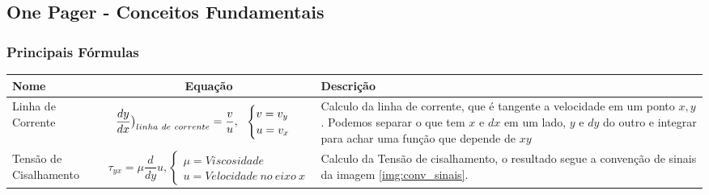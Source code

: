 \documentclass{article}
\begin{document}
            \newpage
        \subsection{One Pager - Conceitos Fundamentais}

            \subsubsection*{Principais Fórmulas}

                \begin{table}[h]\tiny
                    \begin{tabularx}{\textwidth}{|l|c|X|}\hline
                        \textbf{Nome} & \textbf{Equação} & \textbf{Descrição} \\ \hline 

                        \rule{0pt}{10ex} Linha de Corrente & \begin{minipage}{0.5\textwidth}
                                    $$\frac{dy}{dx} \big{)}_{linha \ de \ corrente} = \frac{v}{u}, \ \ \begin{cases}
                                        v = v_y \\ 
                                        u = v_x
                                    \end{cases}$$
                            \end{minipage}&  Calculo da linha de corrente, que é tangente a velocidade em um ponto $x,y$. Podemos separar o que tem $x$ e $dx$ em um lado, $y$ e $dy$ do outro e integrar para achar
                            uma função que depende de $xy$ \\[5ex] \hline

                        \rule{0pt}{8ex} Tensão de Cisalhamento & 
                                    \begin{minipage}{0.5 \textwidth}
                                    $$\tau_{yx} = \mu \frac{d}{dy} u, \begin{cases}
                                        \mu = Viscosidade \\ 
                                        u = Velocidade \ no \ eixo \ x
                                    \end{cases}$$
                                \end{minipage}
                                    
                            & Calculo da Tensão de cisalhamento, o resultado segue a convenção de sinais da imagem \ref{img:conv_sinais}. \\[5ex] \hline


\end{tabularx}
\end{table}
\end{document}
